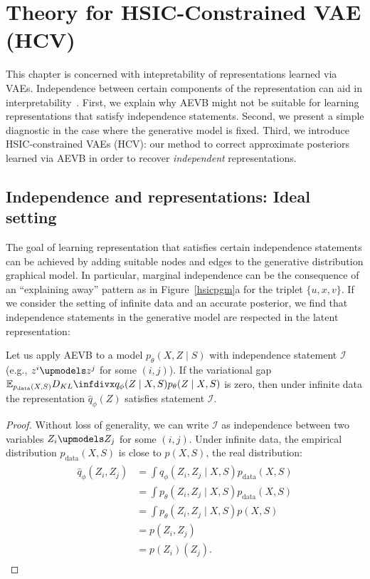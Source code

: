 \section{Theory for HSIC-Constrained VAE (HCV)} 
\label{hsichcv}
This chapter is concerned with intepretability of representations learned via VAEs. Independence between certain components of the representation can aid in interpretability~\cite{betatcVAE, doi:10.1162/neco.1992.4.6.863}. First, we explain why AEVB might not be suitable for learning representations that satisfy independence statements. Second, we present a simple diagnostic in the case where the generative model is fixed. Third, we introduce HSIC-constrained VAEs (HCV): our method to correct approximate posteriors learned via AEVB in order to recover \emph{independent} representations.

\subsection{Independence and representations: Ideal setting}

The goal of learning representation that satisfies certain independence statements can be achieved by adding suitable nodes and edges to the generative distribution graphical model. In particular, marginal independence can be the consequence of an ``explaining away'' pattern as in Figure~\ref{hsicpgm}a for the triplet $\{u, x, v\}$. If we consider the setting of infinite data and an accurate posterior, we find that independence statements in the generative model are respected in the latent representation:

\begin{thm}
\label{hsicvgap}
Let us apply AEVB to a model $p_\theta(X , Z\mid S)$ with independence statement $\mathcal{I}$ (e.g., $z^i \upmodels z^j$ for some $(i, j)$). If the variational gap $\mathbb{E}_{p_\text{data}(X, S)}\kld{q_\phi(Z \mid X, S)}{p_\theta(Z \mid X, S)}$ is zero, then under infinite data the representation $\hat{q}_\phi(Z)$ satisfies statement $\mathcal{I}$.
\end{thm}
\begin{proof}
  Without loss of generality, we can write $\mathcal{I}$ as independence between two variables $Z_i \upmodels Z_j$ for some $(i, j)$. Under infinite data, the empirical distribution $p_\text{data}(X, S)$ is close to $p(X, S)$, the real distribution:
  \begin{align}
  \begin{split}
  \hat{q}_\phi(Z_i, Z_j) & = \int q_\phi(Z_i, Z_j \mid X, S)p_\text{data}(X, S) \\
  &= \int p_\theta(Z_i, Z_j \mid X, S)p_\text{data}(X, S) \\
  &= \int p_\theta(Z_i, Z_j \mid X, S)p(X, S) \\
  &=  p(Z_i, Z_j) \\
  &= p(Z_i)(Z_j).
  \end{split}
  \end{align}
  \end{proof}


